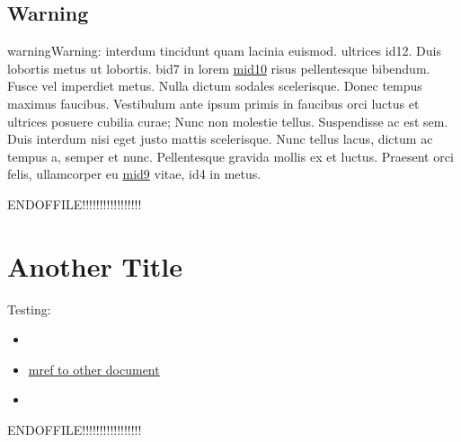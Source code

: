 \documentclass[letterpaper,10pt,english]{sphinxmanual}
\begin{document}
\section{Warning}
\label{\detokenize{test:warning}}
\begin{sphinxadmonition}{warning}{Warning:}
\sphinxAtStartPar
\hyperlink{\detokenize{id3}}{} interdum \hyperlink{\detokenize{id11}}{} tincidunt quam lacinia euismod.
\hyperlink{\detokenize{id8}}{} \hyperlink{\detokenize{id9}}{} ultrices \hypertarget{\detokenize{id12}}{id12}. Duis lobortis
metus ut \hyperlink{\detokenize{bid6}}{\hypertarget{\detokenize{bid6-ref46}}{}} lobortis. \hypertarget{\detokenize{bid7}}{bid7} in lorem
\hyperlink{\detokenize{test-mid10-id0}}{\hypertarget{\detokenize{test-mid10-id1}}{mid10}} risus pellentesque bibendum. Fusce vel
imperdiet metus. Nulla dictum sodales scelerisque. Donec tempus maximus faucibus. Vestibulum ante
ipsum primis in faucibus orci luctus et ultrices posuere cubilia curae; Nunc non molestie tellus.
Suspendisse ac est sem. Duis interdum nisi eget justo mattis scelerisque. Nunc tellus lacus, dictum
ac tempus a, semper et nunc. Pellentesque gravida mollis ex et luctus. Praesent orci felis,
ullamcorper eu \hyperlink{\detokenize{test-mid9-id0}}{\hypertarget{\detokenize{test-mid9-id1}}{mid9}} vitae, \hypertarget{\detokenize{id4}}{id4} in metus.
\end{sphinxadmonition}

\sphinxAtStartPar
ENDOFFILE!!!!!!!!!!!!!!!!!

\sphinxstepscope


\chapter{Another Title}
\label{\detokenize{test_crosspage:another-title}}\label{\detokenize{test_crosspage::doc}}
\sphinxAtStartPar
Testing:
\begin{itemize}
\item {} 
\sphinxAtStartPar
\hyperlink{\detokenize{id1}}{}

\item {} 
\sphinxAtStartPar
\hyperlink{\detokenize{test-mid99-id0}}{\hypertarget{\detokenize{test_crosspage-mid99-id0}}{mref to other document}}

\item {} 
\sphinxAtStartPar
\hyperlink{\detokenize{bid4}}{\hypertarget{\detokenize{bid4-ref1}}{}}

\end{itemize}

\sphinxAtStartPar
ENDOFFILE!!!!!!!!!!!!!!!!!



\renewcommand{\indexname}{Index}
\printindex
\end{document}
